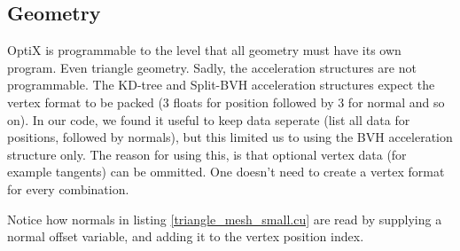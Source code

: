 \subsection{Geometry}

OptiX is programmable to the level that all geometry must have its own program. Even triangle geometry. Sadly, the acceleration structures are not programmable. The KD-tree and Split-BVH acceleration structures expect the vertex format to be packed (3 floats for position followed by 3 for normal and so on). In our code, we found it useful to keep data seperate (list all data for positions, followed by normals), but this limited us to using the BVH acceleration structure only. The reason for using this, is that optional vertex data (for example tangents) can be ommitted. One doesn't need to create a vertex format for every combination.



Notice how normals in listing \ref{triangle_mesh_small.cu} are read by supplying a normal offset variable, and adding it to the vertex position index.